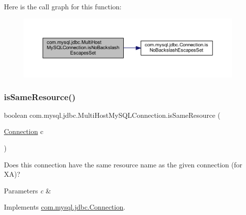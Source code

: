 Here is the call graph for this function\+:
\nopagebreak
\begin{figure}[H]
\begin{center}
\leavevmode
\includegraphics[width=350pt]{classcom_1_1mysql_1_1jdbc_1_1_multi_host_my_s_q_l_connection_a9647bf20f66e69d8a07a2f867957f7f2_cgraph}
\end{center}
\end{figure}
\mbox{\label{classcom_1_1mysql_1_1jdbc_1_1_multi_host_my_s_q_l_connection_a476b5999b12b909b4b43cd3c97b4f5d5}} 
\subsubsection{\texorpdfstring{is\+Same\+Resource()}{isSameResource()}}
{\footnotesize\ttfamily boolean com.\+mysql.\+jdbc.\+Multi\+Host\+My\+S\+Q\+L\+Connection.\+is\+Same\+Resource (\begin{DoxyParamCaption}\item[{\mbox{\hyperlink{interfacecom_1_1mysql_1_1jdbc_1_1_connection}{Connection}}}]{c }\end{DoxyParamCaption})}

Does this connection have the same resource name as the given connection (for XA)?


\begin{DoxyParams}{Parameters}
{\em c} & \\
\hline
\end{DoxyParams}


Implements \mbox{\hyperlink{interfacecom_1_1mysql_1_1jdbc_1_1_connection_a3663c7e933a14a8cc26e16d0f78956a6}{com.\+mysql.\+jdbc.\+Connection}}.

